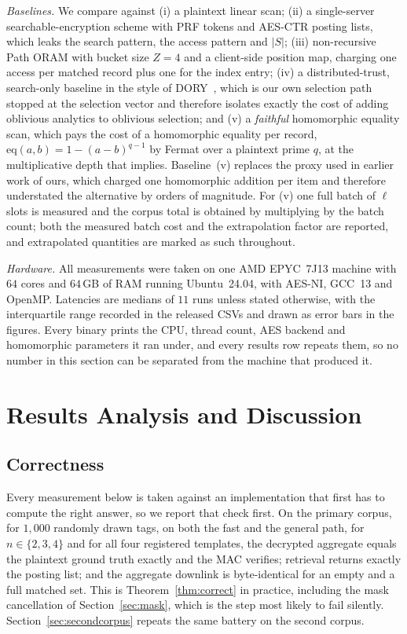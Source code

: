 \documentclass[journal]{IEEEtran}
\begin{document}
\emph{Baselines.} We compare against (i) a plaintext linear scan; (ii) a
single-server searchable-encryption scheme with PRF tokens and AES-CTR posting
lists, which leaks the search pattern, the access pattern and $|S|$; (iii)
non-recursive Path ORAM with bucket size $Z=4$ and a client-side position map,
charging one access per matched record plus one for the index entry; (iv) a
distributed-trust, search-only baseline in the style of DORY~\cite{dory}, which
is our own selection path stopped at the selection vector and therefore isolates
exactly the cost of adding oblivious analytics to oblivious selection; and (v) a
\emph{faithful} homomorphic equality scan, which pays the cost of a homomorphic
equality per record, $\mathrm{eq}(a,b)=1-(a-b)^{q-1}$ by Fermat over a plaintext
prime $q$, at the multiplicative depth that implies. Baseline~(v) replaces the
proxy used in earlier work of ours, which charged one homomorphic addition per
item and therefore understated the alternative by orders of magnitude. For (v)
one full batch of $\ell$ slots is measured and the corpus total is obtained by
multiplying by the batch count; both the measured batch cost and the
extrapolation factor are reported, and extrapolated quantities are marked as
such throughout.

\emph{Hardware.} All measurements were taken on one AMD EPYC~7J13 machine with
$64$ cores and $64$\,GB of RAM running Ubuntu~24.04, with AES-NI, GCC~13 and
OpenMP. Latencies are medians of $11$ runs unless stated otherwise, with the
interquartile range recorded in the released CSVs and drawn as error bars in the
figures. Every binary prints the CPU, thread count, AES backend and homomorphic
parameters it ran under, and every results row repeats them, so no number in
this section can be separated from the machine that produced it.

\section{Results Analysis and Discussion}
\label{sec:resultsdisc}

\subsection{Correctness}
Every measurement below is taken against an implementation that first has to
compute the right answer, so we report that check first. On the primary corpus,
for $1{,}000$ randomly drawn tags, on both the fast and the general path, for
$n\in\{2,3,4\}$ and for all four registered templates, the decrypted aggregate
equals the plaintext ground truth exactly and the MAC verifies; retrieval
returns exactly the posting list; and the aggregate downlink is byte-identical
for an empty and a full matched set. This is Theorem~\ref{thm:correct} in
practice, including the mask cancellation of Section~\ref{sec:mask}, which is
the step most likely to fail silently. Section~\ref{sec:secondcorpus} repeats
the same battery on the second corpus.
\end{document}
